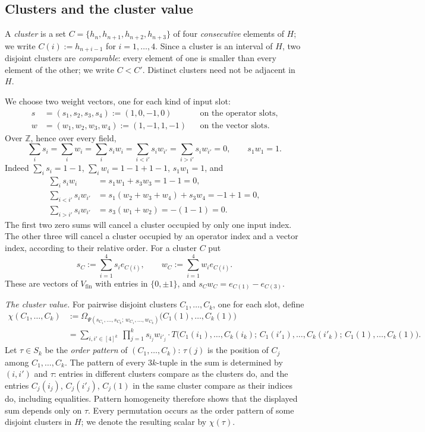 \documentclass[11pt]{amsart}
\theoremstyle{definition}
\theoremstyle{remark}
\numberwithin{equation}{section}
\newcommand{\Z}{\mathbb Z}
\begin{document}
\subsection{Clusters and the cluster value}
A \emph{cluster} is a set $C=\{h_n,h_{n+1},h_{n+2},h_{n+3}\}$ of four
\emph{consecutive} elements of $H$; we write $C(i):=h_{n+i-1}$ for $i=1,\dots,4$. Since a cluster is an interval of
$H$, two disjoint clusters are \emph{comparable}: every element of one is smaller than every element of the other; we
write $C<C'$. Distinct clusters need not be adjacent in $H$.

We choose two weight vectors, one for each kind of input slot:
\begin{align*}
s&=(s_1,s_2,s_3,s_4):=(1,0,-1,0)&&\text{on the operator slots},\\
w&=(w_1,w_2,w_3,w_4):=(1,-1,1,-1)&&\text{on the vector slots}.
\end{align*}
Over $\Z$, hence over every field,
\begin{equation*}\tag{W}\label{eq:W}
\sum_is_i=\sum_iw_i=\sum_is_iw_i=\sum_{i<i'}s_iw_{i'}=\sum_{i>i'}s_iw_{i'}=0,\qquad s_1w_1=1.
\end{equation*}
Indeed $\sum_is_i=1-1$, $\sum_iw_i=1-1+1-1$, $s_1w_1=1$, and
\begin{align*}
\sum_is_iw_i&=s_1w_1+s_3w_3=1-1=0,\\
\sum_{i<i'}s_iw_{i'}&=s_1(w_2+w_3+w_4)+s_3w_4=-1+1=0,\\
\sum_{i>i'}s_iw_{i'}&=s_3(w_1+w_2)=-(1-1)=0 .
\end{align*}
The first two zero sums will cancel a cluster occupied by only one input index. The other three will cancel a
cluster occupied by an operator index and a vector index, according to their relative order. For a cluster $C$ put
\[
s_C:=\sum_{i=1}^4s_ie_{C(i)},\qquad w_C:=\sum_{i=1}^4w_ie_{C(i)} .
\]
These are vectors of $V_{\mathrm{fin}}$ with entries in $\{0,\pm1\}$, and $s_Cw_C=e_{C(1)}-e_{C(3)}$.

\emph{The cluster value.} For pairwise disjoint clusters $C_1,\dots,C_k$, one for each slot, define
\begin{align*}
\chi(C_1,\dots,C_k)&:=\Omega_{\Psi(s_{C_1},\dots,s_{C_k};\,w_{C_1},\dots,w_{C_k})}\bigl(C_1(1),\dots,C_k(1)\bigr)\\
&=\sum_{i,i'\in[4]^k}\ \prod_{j=1}^ks_{i_j}w_{i'_j}\cdot
T\bigl(C_1(i_1),\dots,C_k(i_k);\,C_1(i'_1),\dots,C_k(i'_k);\,C_1(1),\dots,C_k(1)\bigr).
\end{align*}
Let $\tau\in S_k$ be the \emph{order pattern} of $(C_1,\dots,C_k)$: $\tau(j)$ is the position of $C_j$ among
$C_1,\dots,C_k$. The pattern of every $3k$\nobreakdash-tuple in the sum is determined by $(i,i')$ and $\tau$: entries in different
clusters compare as the clusters do, and the entries $C_j(i_j)$, $C_j(i'_j)$, $C_j(1)$ in the same cluster compare as
their indices do, including equalities. Pattern homogeneity therefore shows that the displayed sum depends only
on $\tau$. Every permutation occurs as the order pattern of some disjoint clusters in $H$; we denote the resulting
scalar by $\chi(\tau)$.
\end{document}
